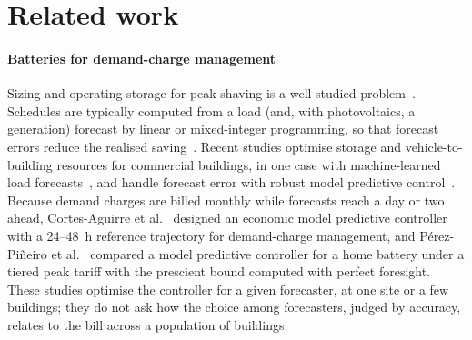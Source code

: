 \section{Related work}\label{sec:related}

\paragraph{Batteries for demand-charge management} Sizing and operating storage for peak shaving is a well-studied problem~\cite{oudalov2007sizing,leadbetter2012battery,papadopoulos2020peak}. Schedules are typically computed from a load (and, with photovoltaics, a generation) forecast by linear or mixed-integer programming, so that forecast errors reduce the realised saving~\cite{hanna2014dispatch}. Recent studies optimise storage and vehicle-to-building resources for commercial buildings, in one case with machine-learned load forecasts~\cite{ghafoori2023v2b,jiang2026v2b}, and handle forecast error with robust model predictive control~\cite{mary2025rmpc}. Because demand charges are billed monthly while forecasts reach a day or two ahead, Cortes-Aguirre et al.~\cite{cortesaguirre2025empc} designed an economic model predictive controller with a 24--48~h reference trajectory for demand-charge management, and P\'erez-Pi\~neiro et al.~\cite{perezpineiro2026tiered} compared a model predictive controller for a home battery under a tiered peak tariff with the prescient bound computed with perfect foresight. These studies optimise the controller for a given forecaster, at one site or a few buildings; they do not ask how the choice among forecasters, judged by accuracy, relates to the bill across a population of buildings.


